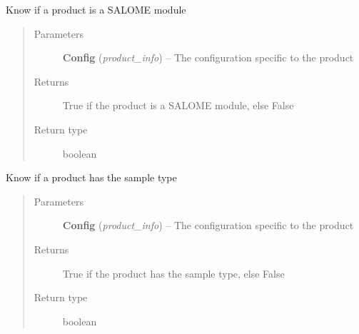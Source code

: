 \documentclass[a4paper,10pt,english]{sphinxmanual}
\begin{document}
\begin{fulllineitems}
\label{commands/apidoc/src:src.product.product_is_salome}
Know if a product is a SALOME module
\begin{quote}\begin{description}
\item[{Parameters}] \leavevmode
\textbf{Config} (\emph{product\_info}) -- The configuration specific to 
the product

\item[{Returns}] \leavevmode
True if the product is a SALOME module, else False

\item[{Return type}] \leavevmode
boolean

\end{description}\end{quote}

\end{fulllineitems}


\begin{fulllineitems}
\label{commands/apidoc/src:src.product.product_is_sample}
Know if a product has the sample type
\begin{quote}\begin{description}
\item[{Parameters}] \leavevmode
\textbf{Config} (\emph{product\_info}) -- The configuration specific to 
the product

\item[{Returns}] \leavevmode
True if the product has the sample type, else False

\item[{Return type}] \leavevmode
boolean

\end{description}\end{quote}

\end{fulllineitems}

\end{document}
